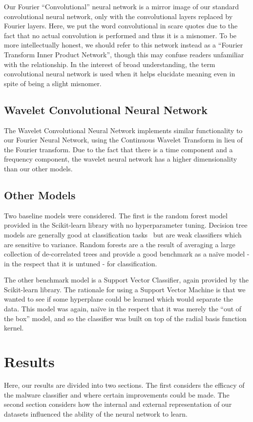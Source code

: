 \documentclass[10pt]{article}
\begin{document}
Our Fourier ``Convolutional'' neural network is a mirror image of our standard convolutional neural network, only with the convolutional layers replaced by Fourier layers.
Here, we put the word convolutional in scare quotes due to the fact that no actual convolution is performed and thus it is a misnomer.
To be more intellectually honest, we should refer to this network instead as a ``Fourier Transform Inner Product Network'', though this may confuse readers unfamiliar with the relationship.
In the interest of broad understanding, the term convolutional neural network is used when it helps elucidate meaning even in spite of being a slight misnomer.

\subsection{Wavelet Convolutional Neural Network} \label{wavelet cnn}
The Wavelet Convolutional Neural Network implements similar functionality to our Fourier Neural Network, using the Continuous Wavelet Transform in lieu of the Fourier transform.
Due to the fact that there is a time component and a frequency component, the wavelet neural network has a higher dimensionality than our other models. 



\subsection{Other Models} \label{other models}
Two baseline models were considered.
The first is the random forest model provided in the Scikit-learn library with no hyperparameter tuning.
Decision tree models are generally good at classification tasks~\cite{hastie01statisticallearning} but are weak classifiers which are sensitive to variance.
Random forests are a the result of averaging a large collection of de-correlated trees and provide a good benchmark as a na\"ive model - in the respect that it is untuned - for classification.

The other benchmark model is a Support Vector Classifier, again provided by the Scikit-learn library.
The rationale for using a Support Vector Machine is that we wanted to see if some hyperplane could be learned which would separate the data.
This model was again, na\"ive in the respect that it was merely the ``out of the box'' model, and so the classifier was built on top of the radial basis function kernel.

\section{Results}
Here, our results are divided into two sections. 
The first considers the efficacy of the malware classifier and where certain improvements could be made.
The second section considers how the internal and external representation of our datasets influenced the ability of the neural network to learn.
\end{document}
